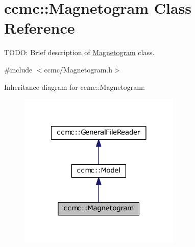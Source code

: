 \hypertarget{classccmc_1_1_magnetogram}{\section{ccmc\-:\-:Magnetogram Class Reference}
\label{classccmc_1_1_magnetogram}
}


T\-O\-D\-O\-: Brief description of \hyperlink{classccmc_1_1_magnetogram}{Magnetogram} class.  




{\ttfamily \#include $<$ccmc/\-Magnetogram.\-h$>$}



Inheritance diagram for ccmc\-:\-:Magnetogram\-:
\nopagebreak
\begin{figure}[H]
\begin{center}
\leavevmode
\includegraphics[width=218pt]{classccmc_1_1_magnetogram__inherit__graph}
\end{center}
\end{figure}


